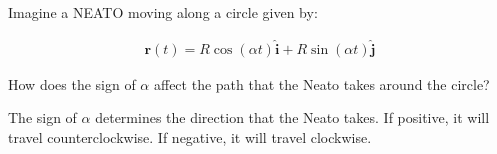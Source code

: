 Imagine a NEATO moving along a circle given by:

\begin{align*}
    \boldsymbol{r}(t) = R\cos(\alpha t) \hat{\boldsymbol{i}} + R\sin(\alpha t) \hat{\boldsymbol{j}}
\end{align*}

How does the sign of $\alpha$ affect the path that the Neato takes around the circle?

\begin{solution}
    The sign of $\alpha$ determines the direction that the Neato takes. If positive, it will travel counterclockwise. If negative, it will travel clockwise.
\end{solution}